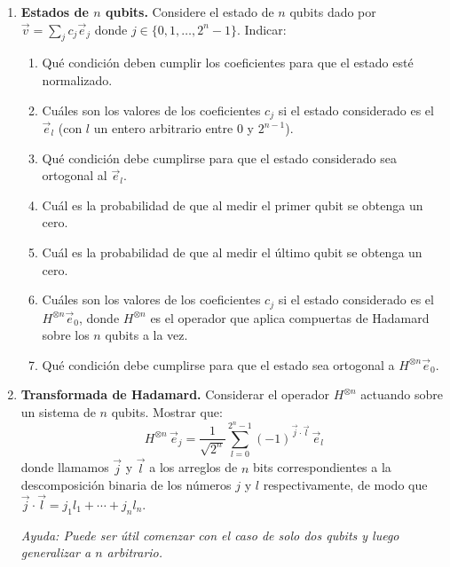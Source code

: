 \documentclass[a4paper,11pt,spanish]{article}
\begin{document}
\begin{enumerate}
 \item {\bf Estados de $n$ qubits.} Considere el estado de $n$ qubits dado por $\vec v = \sum_j c_j \vec e_j$ donde $j\in\{0,1,\ldots,2^n-1\}$. Indicar:
 \begin{enumerate}  
  \item Qué condición deben cumplir los coeficientes para que el estado esté normalizado.
  \item Cu\'ales son los valores de los coeficientes $c_j$ si el estado considerado es el $\vec e_l$ (con $l$ un entero arbitrario entre 0 y $2^{n-1}$).
  \item Qu\'e condici\'on debe cumplirse para que el estado considerado sea ortogonal al $\vec e_l$.
  \item Cuál es la probabilidad de que al medir el primer qubit se obtenga un cero.
  \item Cuál es la probabilidad de que al medir el último qubit se obtenga un cero.
  \item Cu\'ales son los valores de los coeficientes $c_j$ si el estado considerado es el $H^{\otimes n} \vec e_0$, donde $H^{\otimes n}$ es el operador que aplica compuertas de Hadamard sobre los $n$ qubits a la vez.
  \item Qu\'e condici\'on debe cumplirse para que el estado sea ortogonal a $H^{\otimes n} \vec e_0$.
  \end{enumerate}
  
  \item {\bf Transformada de Hadamard.} Considerar el operador $H^{\otimes n}$ actuando sobre un sistema de $n$ qubits. Mostrar que:
  $$H^{\otimes n}\, \vec e_j = \frac{1}{\sqrt{2^n}} \sum_{l=0}^{2^n-1} (-1)^{\vec j \cdot \vec l}\, \vec e_l$$
  donde llamamos $\vec j$ y $\vec l$ a los arreglos de $n$ bits correspondientes a la descomposición binaria de los números $j$ y $l$ respectivamente, de modo que $\vec j \cdot \vec l = j_1 l_1 + \cdots + j_n l_n$.

  {\it Ayuda: Puede ser útil comenzar con el caso de solo dos qubits y luego generalizar a $n$ arbitrario.}

\end{enumerate}
\end{document}

